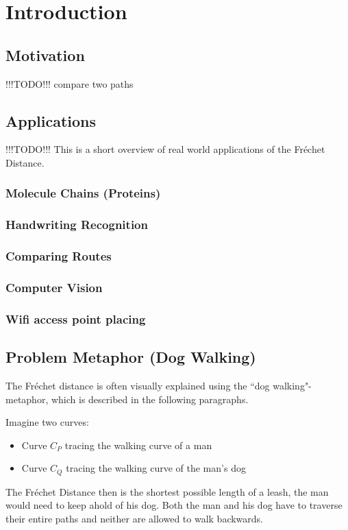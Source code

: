 \section{Introduction}

\subsection{Motivation} !!!TODO!!!
	compare two paths

\subsection{Applications} !!!TODO!!!
	This is a short overview of real world applications of the Fréchet Distance.
\subsubsection{Molecule Chains (Proteins)}
\subsubsection{Handwriting Recognition}
\subsubsection{Comparing Routes}
\subsubsection{Computer Vision}
\subsubsection{Wifi access point placing}

\subsection{Problem Metaphor (Dog Walking)} \label{dogwalking}

The Fréchet distance is often visually explained using the ``dog walking"-metaphor, which is described in the following paragraphs.

Imagine two curves:
\begin{itemize}
	\item Curve $C_P$ tracing the walking curve of a man
	\item Curve $C_Q$ tracing the walking curve of the man's dog
\end{itemize}

The Fréchet Distance then is the shortest possible length of a leash, the man would need to keep ahold of his dog. Both the man and his dog have to traverse their entire paths and neither are allowed to walk backwards.


